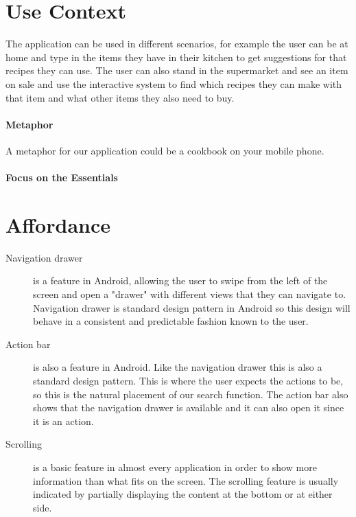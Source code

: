 \documentclass[a4paper,12pt]{memoir}
\begin{document}
\section*{Use Context}

The application can be used in different scenarios, for example the user can be at home and type in the items they have in their kitchen to get suggestions for that recipes they can use. The user can also stand in the supermarket and see an item on sale and use the interactive system to find which recipes they can make with that item and what other items they also need to buy. 

\paragraph{Metaphor}

A metaphor for our application could be a cookbook on your mobile phone. 

\paragraph{Focus on the Essentials}

\section*{Affordance}

\begin{description}

\item [Navigation drawer] is a feature in Android, allowing the user to swipe from the left of the screen and open a "drawer" with different views that they can navigate to. Navigation drawer is standard design pattern in Android so this design will behave in a consistent and predictable fashion known to the user.
\item [Action bar] is also a feature in Android. Like the navigation drawer this is also a standard design pattern. This is where the user expects the actions to be, so this is the natural placement of our search function. The action bar also shows that the navigation drawer is available and it can also open it since it is an action. 
\item[Scrolling] is a basic feature in almost every application in order to show more information than what fits on the screen. The scrolling feature is usually indicated by partially displaying the content at the bottom or at either side.

\end{description}
\end{document}

